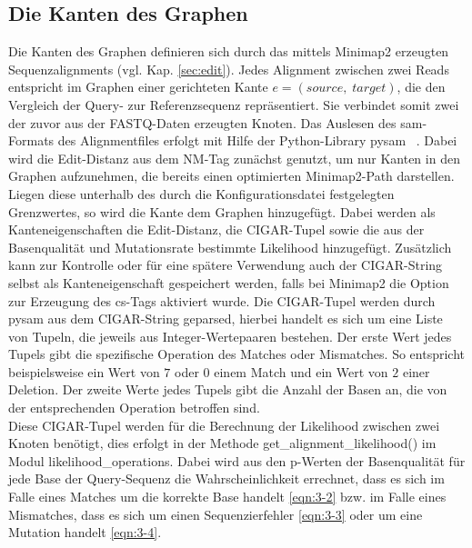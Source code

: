 \subsection{Die Kanten des Graphen}
Die Kanten des Graphen definieren sich durch das mittels Minimap2 erzeugten Sequenzalignments (vgl. Kap. \ref{sec:edit}). Jedes Alignment zwischen zwei Reads entspricht im Graphen einer gerichteten Kante $e = (source,\; target)$, die den Vergleich der Query- zur Referenzsequenz repräsentiert. Sie verbindet somit zwei der zuvor aus der FASTQ-Daten erzeugten Knoten. Das Auslesen des sam-Formats des Alignmentfiles erfolgt mit Hilfe der Python-Library pysam ~\cite{pysam}. Dabei wird die Edit-Distanz aus dem NM-Tag zunächst genutzt, um nur Kanten in den Graphen aufzunehmen, die bereits einen optimierten Minimap2-Path darstellen. Liegen diese unterhalb des durch die Konfigurationsdatei festgelegten Grenzwertes, so wird die Kante dem Graphen hinzugefügt. Dabei werden als Kanteneigenschaften die Edit-Distanz, die CIGAR-Tupel sowie die aus der Basenqualität und Mutationsrate bestimmte Likelihood hinzugefügt. Zusätzlich kann zur Kontrolle oder für eine spätere Verwendung auch der CIGAR-String selbst als Kanteneigenschaft gespeichert werden, falls bei Minimap2 die Option zur Erzeugung des cs-Tags aktiviert wurde. Die CIGAR-Tupel werden durch pysam aus dem CIGAR-String geparsed, hierbei handelt es sich um eine Liste von Tupeln, die jeweils aus Integer-Wertepaaren bestehen. Der erste Wert jedes Tupels gibt die spezifische Operation des Matches oder Mismatches. So entspricht beispielsweise ein Wert von $ 7 $ oder $ 0 $ einem Match und ein Wert von $ 2 $ einer Deletion. Der zweite Werte jedes Tupels gibt die Anzahl der Basen an, die von der entsprechenden Operation betroffen sind. \\

Diese CIGAR-Tupel werden für die Berechnung der Likelihood zwischen zwei Knoten benötigt, dies erfolgt in der Methode get\_alignment\_likelihood() im Modul likelihood\_operations. Dabei wird aus den p-Werten der Basenqualität für jede Base der Query-Sequenz die Wahrscheinlichkeit errechnet, dass es sich im Falle eines Matches um die korrekte Base handelt  \eqref{eqn:3-2} bzw. im Falle eines Mismatches, dass es sich um einen Sequenzierfehler \eqref{eqn:3-3} oder um eine Mutation handelt \eqref{eqn:3-4}. \\

